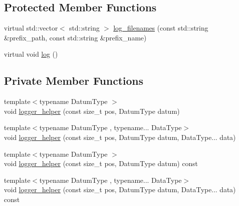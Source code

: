 \subsection*{Protected Member Functions}
\begin{DoxyCompactItemize}
\item 
virtual std\+::vector$<$ std\+::string $>$ \mbox{\hyperlink{classbfl_1_1Logger_a328ceaa8e70e6918f11142b12b8be217}{log\+\_\+filenames}} (const std\+::string \&prefix\+\_\+path, const std\+::string \&prefix\+\_\+name)
\item 
virtual void \mbox{\hyperlink{classbfl_1_1Logger_ad44f46593cb8c4c87c1178eb326e2f64}{log}} ()
\end{DoxyCompactItemize}
\subsection*{Private Member Functions}
\begin{DoxyCompactItemize}
\item 
{\footnotesize template$<$typename Datum\+Type $>$ }\\void \mbox{\hyperlink{classbfl_1_1Logger_a0904d00289e404f5bae335db56ceacae}{logger\+\_\+helper}} (const size\+\_\+t pos, Datum\+Type datum)
\item 
{\footnotesize template$<$typename Datum\+Type , typename... Data\+Type$>$ }\\void \mbox{\hyperlink{classbfl_1_1Logger_ac45b73649e685802837bf97c10146c3a}{logger\+\_\+helper}} (const size\+\_\+t pos, Datum\+Type datum, Data\+Type... data)
\item 
{\footnotesize template$<$typename Datum\+Type $>$ }\\void \mbox{\hyperlink{classbfl_1_1Logger_a73ff9a8b5a316a2338967fdfb7440aea}{logger\+\_\+helper}} (const size\+\_\+t pos, Datum\+Type datum) const
\item 
{\footnotesize template$<$typename Datum\+Type , typename... Data\+Type$>$ }\\void \mbox{\hyperlink{classbfl_1_1Logger_a9ac71d17bc482feeda35c6d91396cac2}{logger\+\_\+helper}} (const size\+\_\+t pos, Datum\+Type datum, Data\+Type... data) const
\end{DoxyCompactItemize}
